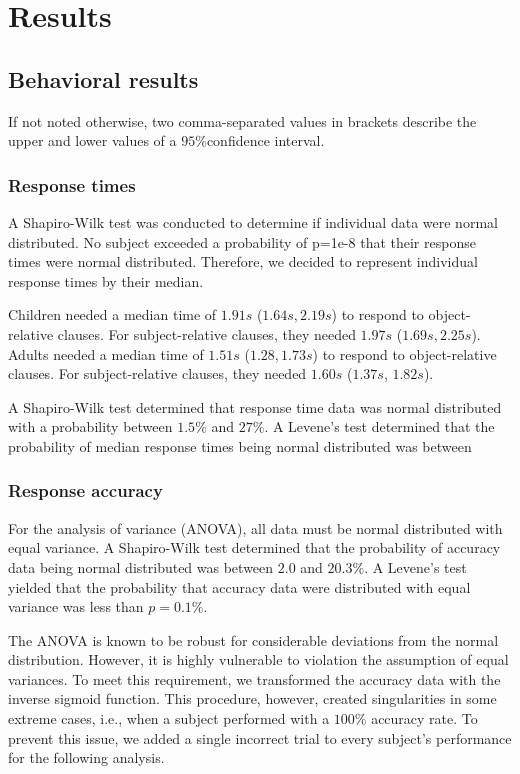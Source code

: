 \chapter{Results}\label{results}

\section{Behavioral results}

If not noted otherwise, two comma-separated values in brackets describe the upper and lower values of a $95\% $confidence interval.

\subsection{Response times}

A Shapiro-Wilk test was conducted to determine if individual data were normal distributed.
No subject exceeded a probability of p=1e-8 that their response times were normal distributed.
Therefore, we decided to represent individual response times by their median.

Children needed a median time of $1.91s$ ($1.64s, 2.19s$) to respond to object-relative clauses.
For subject-relative clauses, they needed $1.97s$ ($1.69s, 2.25s$).
Adults needed a median time of $1.51s$ ($1.28, 1.73s$) to respond to object-relative clauses.
For subject-relative clauses, they needed $1.60s$ ($1.37s$, $1.82s$).

A Shapiro-Wilk test determined that response time data was normal distributed with a probability between $1.5\%$ and $27\%$.
A Levene's test determined that the probability of median response times being normal distributed was between 

\subsection{Response accuracy}

For the analysis of variance (ANOVA), all data must be normal distributed with equal variance.
A Shapiro-Wilk test determined that the probability of accuracy data being normal distributed was between $2.0$ and $20.3\%$.
A Levene's test yielded that the probability that accuracy data were distributed with equal variance was less than $p = 0.1\%$.

The ANOVA is known to be robust for considerable deviations from the normal distribution.
However, it is highly vulnerable to violation the assumption of equal variances.
To meet this requirement, we transformed the accuracy data with the inverse sigmoid function.
This procedure, however, created singularities in some extreme cases, i.e., when a subject performed with a $100\%$ accuracy rate.
To prevent this issue, we added a single incorrect trial to every subject's performance for the following analysis.

